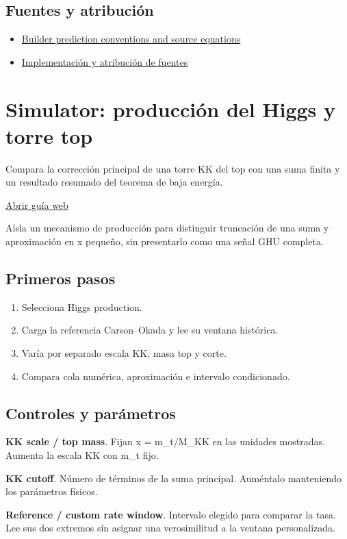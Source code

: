 \documentclass[11pt,a4paper]{article}
\begin{document}
\subsection*{Fuentes y atribución}
\begin{itemize}
\item \href{https://github.com/karlesmarin/ghu-lab/blob/main/src/sections/predict_section.js}{Builder prediction conventions and source equations}
\item \href{https://github.com/karlesmarin/ghu-lab/blob/main/src/modules/predict.mjs}{Implementación y atribución de fuentes}
\end{itemize}
\section{Simulator: producción del Higgs y torre top}
Compara la corrección principal de una torre KK del top con una suma finita y un resultado resumado del teorema de baja energía.

\href{https://karlesmarin.github.io/ghu-explorer/guide/es/simulator-higgsrate/index.html}{Abrir guía web}

Aísla un mecanismo de producción para distinguir truncación de una suma y aproximación en x pequeño, sin presentarlo como una señal GHU completa.
\subsection*{Primeros pasos}
\begin{enumerate}
\item Selecciona Higgs production.
\item Carga la referencia Carson--Okada y lee su ventana histórica.
\item Varía por separado escala KK, masa top y corte.
\item Compara cola numérica, aproximación e intervalo condicionado.
\end{enumerate}
\subsection*{Controles y parámetros}
\textbf{KK scale / top mass}. Fijan x = m\_t/M\_KK en las unidades mostradas. Aumenta la escala KK con m\_t fijo.

\textbf{KK cutoff}. Número de términos de la suma principal. Auméntalo manteniendo los parámetros físicos.

\textbf{Reference / custom rate window}. Intervalo elegido para comparar la tasa. Lee sus dos extremos sin asignar una verosimilitud a la ventana personalizada.
\end{document}
